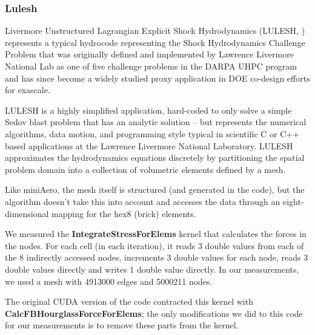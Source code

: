 \subsubsection{Lulesh}\label{sec:lulesh-summary}


Livermore Unstructured Lagrangian Explicit Shock Hydrodynamics (LULESH,
\cite{LULESH2:changes}) represents a typical hydrocode representing the Shock
Hydrodynamics Challenge Problem that was originally defined and implemented by
Lawrence Livermore National Lab as one of five challenge problems in the DARPA
UHPC program and has since become a widely studied proxy application in DOE
co-design efforts for exascale. 

LULESH is a highly simplified application, hard-coded to only solve a simple
Sedov blast problem that has an analytic solution \cite{LULESH:spec} – but
represents the numerical algorithms, data motion, and programming style typical
in scientific C or C++ based applications at the Lawrence Livermore National
Laboratory. LULESH approximates the hydrodynamics equations discretely by
partitioning the spatial problem domain into a collection of volumetric elements
defined by a mesh.

Like miniAero, the mesh itself is structured (and generated in the code), but
the algorithm doesn't take this into account and accesses the data through an
eight-dimensional mapping for the hex8 (brick) elements.

We measured the \textbf{IntegrateStressForElems} kernel that calculates the
forces in the nodes. For each cell (in each iteration), it reads 3 double values
from each of the 8 indirectly accessed nodes, increments 3 double values for
each node, reads 3 double values directly and writes 1 double value directly. In
our measurements, we used a mesh with \num{4913000} edges and \num{5000211}
nodes.

The original CUDA version of the code contracted this kernel with
\textbf{CalcFBHourglassForceForElems}; the only modifications we did to this
code for our measurements is to remove these parts from the kernel.

